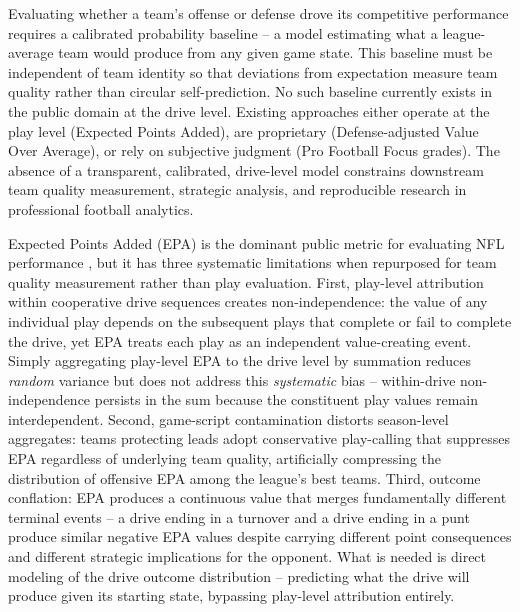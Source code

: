 \documentclass[12pt,a4paper]{article}
\begin{document}
Evaluating whether a team's offense or defense drove its competitive performance requires a calibrated probability baseline -- a model estimating what a league-average team would produce from any given game state. This baseline must be independent of team identity so that deviations from expectation measure team quality rather than circular self-prediction. No such baseline currently exists in the public domain at the drive level. Existing approaches either operate at the play level (Expected Points Added), are proprietary (Defense-adjusted Value Over Average), or rely on subjective judgment (Pro Football Focus grades). The absence of a transparent, calibrated, drive-level model constrains downstream team quality measurement, strategic analysis, and reproducible research in professional football analytics.

Expected Points Added (EPA) is the dominant public metric for evaluating NFL performance \citep{carl2021nflfastr, yurko2019nflwar}, but it has three systematic limitations when repurposed for team quality measurement rather than play evaluation. First, play-level attribution within cooperative drive sequences creates non-independence: the value of any individual play depends on the subsequent plays that complete or fail to complete the drive, yet EPA treats each play as an independent value-creating event. Simply aggregating play-level EPA to the drive level by summation reduces \emph{random} variance but does not address this \emph{systematic} bias -- within-drive non-independence persists in the sum because the constituent play values remain interdependent. Second, game-script contamination distorts season-level aggregates: teams protecting leads adopt conservative play-calling that suppresses EPA regardless of underlying team quality, artificially compressing the distribution of offensive EPA among the league's best teams. Third, outcome conflation: EPA produces a continuous value that merges fundamentally different terminal events -- a drive ending in a turnover and a drive ending in a punt produce similar negative EPA values despite carrying different point consequences and different strategic implications for the opponent. What is needed is direct modeling of the drive outcome distribution -- predicting what the drive will produce given its starting state, bypassing play-level attribution entirely.
\end{document}
